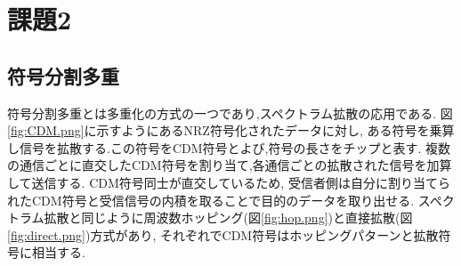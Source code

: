 \section{課題2}
\subsection{符号分割多重\cite{4D69637228:online}}
符号分割多重とは多重化の方式の一つであり,スペクトラム拡散の応用である.
図\ref{fig:CDM.png}に示すようにあるNRZ符号化されたデータに対し,
ある符号を乗算し信号を拡散する.この符号をCDM符号とよび,符号の長さをチップと表す.
複数の通信ごとに直交したCDM符号を割り当て,各通信ごとの拡散された信号を加算して送信する.
CDM符号同士が直交しているため,
受信者側は自分に割り当てられたCDM符号と受信信号の内積を取ることで目的のデータを取り出せる.
スペクトラム拡散と同じように周波数ホッピング(図\ref{fig:hop.png})と直接拡散(図\ref{fig:direct.png})方式があり,
それぞれでCDM符号はホッピングパターンと拡散符号に相当する.
\begin{figure}[htbp]
  \begin{minipage}{0.5\hsize}
  \end{minipage}
  \begin{minipage}{0.5\hsize}
  \end{minipage} 
\end{figure}
\newpage